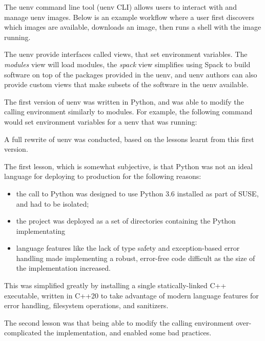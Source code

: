 The uenv command line tool (uenv CLI) allows users to interact with and manage uenv images.
Below is an example workflow where a user first discovers which images are available, downloads an image, then runs a shell with the image running.



The uenv provide interfaces called views, that set environment variables.
The \emph{modules} view will load modules, the \emph{spack} view simplifies using Spack to build software on top of the packages provided in the uenv, and uenv authors can also provide custom views that make subsets of the software in the uenv available.



The first version of uenv was written in Python, and was able to modify the calling environment similarly to modules.
For example, the following command would set environment variables for a uenv that was running:


A full rewrite of uenv was conducted, based on the lessons learnt from this first version.

The first lesson, which is somewhat subjective, is that Python was not an ideal language for deploying to production for the following reasons:
\begin{itemize}
    \item the call to Python was designed to use Python 3.6 installed as part of SUSE, and had to be isolated;
    \item the project was deployed as a set of directories containing the Python implementating
    \item language features like the lack of type safety and exception-based error handling made implementing a robust, error-free code difficult as the size of the implementation increased.
\end{itemize}

This was simplified greatly by installing a single statically-linked C++ executable, written in C++20 to take advantage of modern language features for error handling, filesystem operations, and sanitizers.

The second lesson was that being able to modify the calling environment over-complicated the implementation, and enabled some bad practices.

